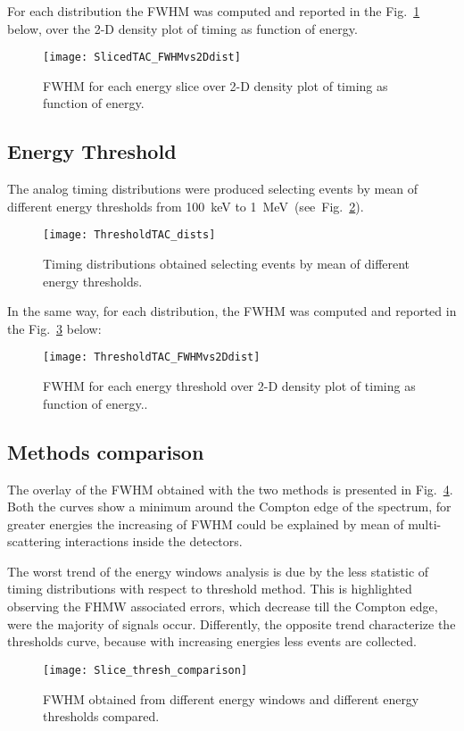 For each distribution the FWHM was computed and reported in the Fig.~\ref{fig: energy windows analog} below, over the 2-D density plot of timing as function of energy.
\begin{figure}[h!]
	\centering
	\texttt{[image: SlicedTAC\_FWHMvs2Ddist]}
	\caption{FWHM for each energy slice over 2-D density plot of timing as function of energy. }
	\label{fig: energy windows analog}
\end{figure}

\subsection*{Energy Threshold}
 The analog timing distributions were produced selecting events by mean of different energy thresholds from 100~keV to 1~MeV~(see~Fig.~\ref{Fig: lower energy thr}). 

\begin{figure}[h!]
	\centering
	\texttt{[image: ThresholdTAC\_dists]}
	\caption{Timing distributions obtained selecting events by mean of different energy thresholds.}
	\label{Fig: lower energy thr}
\end{figure}

In the same way, for each distribution, the FWHM was computed and reported in the Fig.~\ref{Fig:2Dplot_th} below:

\begin{figure}[h!]
	\centering
	\texttt{[image: ThresholdTAC\_FWHMvs2Ddist]}
	\caption{FWHM for each energy threshold over 2-D density plot of timing as function of energy..}
	\label{Fig:2Dplot_th}
\end{figure}

\subsection*{Methods  comparison}

The overlay of the FWHM obtained with the two methods is presented in Fig.~\ref{Fig:Slice_th_comp}. Both the curves show a minimum around the Compton edge of the spectrum, for greater energies the increasing of FWHM could be explained by mean of multi-scattering interactions inside the detectors. 

The worst trend of the energy windows analysis is due by the less statistic of timing distributions with respect to threshold method. This is highlighted observing the FHMW associated errors, which decrease till the Compton edge, were the majority of signals occur. Differently, the opposite trend characterize the thresholds curve, because with increasing energies less events are collected.
\begin{figure}[H]
	\centering
	\texttt{[image: Slice\_thresh\_comparison]}
	\caption{FWHM obtained from different energy windows and different energy thresholds compared.}
	\label{Fig:Slice_th_comp}
\end{figure}










